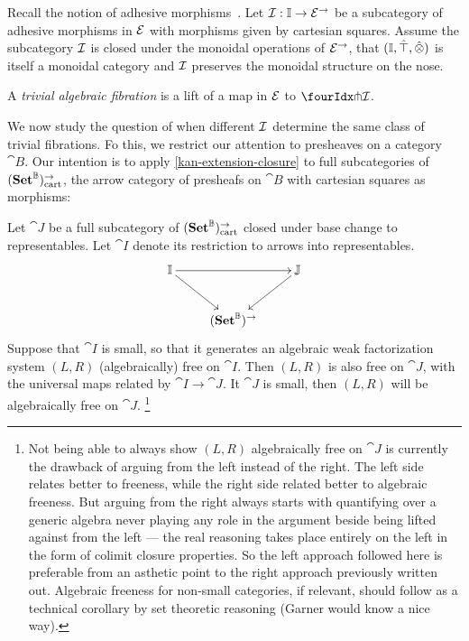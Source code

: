 \documentclass[reqno,10pt,a4paper,oneside]{amsart}
\begin{document}
Recall the notion of adhesive morphisms~\cite{garner-lack:adhesive}.
Let $\cal{I} : \cat{I} \to \catE^{\to}$ be a subcategory of adhesive morphisms in $\catE$ with morphisms given by cartesian squares.
Assume the subcategory $\cal{I}$ is closed under the monoidal operations of $\catE^{\to}$, \ie that $(\cat{I}, \hatunit, \hatotimes)$ is itself a monoidal category and $\cal{I}$ preserves the monoidal structure on the nose.

\begin{definition} A \emph{trivial algebraic fibration} is a lift of a map in $\catE$ to $\liftr{\cal{I}}$.
\end{definition} 


We now study the question of when different $\cal{I}$ determine the same class of trivial fibrations. Fo this, we restrict our
attention to  presheaves on a category $\cat{B}$.
Our intention is to apply \cref{kan-extension-closure} to full subcategories of $(\Set^{\cat{B}})_{\cart}^{\to}$, the arrow category of presheafs on $\cat{B}$ with cartesian squares as morphisms:

\begin{proposition}
\label{awfs-on-arrows-into-representables}
Let $\cat{J}$ be a full subcategory of $(\Set^{\cat{B}})_{\cart}^{\to}$ closed under base change to representables.
Let $\cat{I}$ denote its restriction to arrows into representables.
\[
\xymatrix{
  \cat{I}
  \ar[rr]
  \ar[dr]
&&
  \cat{J}
  \ar[dl]
\\&
  (\Set^{\cat{B}})^{\to}
}
\]
Suppose that $\cat{I}$ is small, so that it generates an algebraic weak factorization system $(L, R)$ (algebraically) free on $\cat{I}$.
Then $(L, R)$ is also free on $\cat{J}$, with the universal maps related by $\cat{I} \to \cat{J}$.
It $\cat{J}$ is small, then $(L, R)$ will be algebraically free on $\cat{J}$.%
\footnote{
  Not being able to always show $(L, R)$ algebraically free on $\cat{J}$ is currently the drawback of arguing from the left instead of the right.
  The left side relates better to freeness, while the right side related better to algebraic freeness.
  But arguing from the right always starts with quantifying over a generic algebra never playing any role in the argument beside being lifted against from the left --- the real reasoning takes place entirely on the left in the form of colimit closure properties.
  So the left approach followed here is preferable from an asthetic point to the right approach previously written out.
  Algebraic freeness for non-small categories, if relevant, should follow as a technical corollary by set theoretic reasoning (Garner would know a nice way).
}
\end{proposition}
\end{document}
